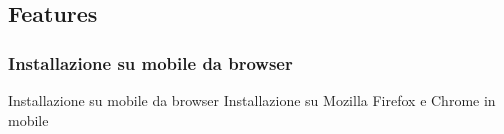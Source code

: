 \documentclass[xcolor=svgnames, aspectratio=169]{beamer}
\begin{document}

\subsection{Features}

\subsubsection{Installazione su mobile da browser}

\begin{frame}{Installazione su mobile da browser}
    Installazione su Mozilla Firefox e Chrome in mobile
    \begin{columns}[t]
        \vspace*{-8pt}
        \begin{figure}[H]
            \centering

\end{figure}
\end{columns}
\end{frame}
\end{document}
